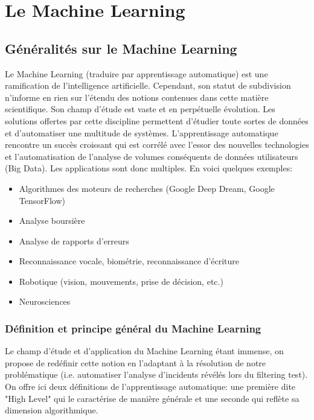 \chapter{ Le  Machine Learning}
\label{Le Machine Learning}
\thispagestyle{fancy}

\section{Généralités sur le Machine Learning}
\label{Le Machine Learning: Généralités sur le Machine Learning}
Le Machine Learning (traduire par apprentissage automatique) est une ramification de l'intelligence artificielle. Cependant, son statut de subdivision n'informe en rien sur l'étendu des notions contenues dans cette matière scientifique. Son champ d'étude est vaste et en perpétuelle évolution. Les solutions offertes par cette discipline permettent d'étudier toute sortes de données et d'automatiser une multitude de systèmes. L'apprentissage automatique rencontre un succès croissant qui est corrélé avec l'essor des nouvelles technologies et l'automatisation de l'analyse de volumes conséquents de données utilisateurs (Big Data). Les applications sont donc multiples. En voici quelques exemples:  

\begin{itemize}
	\item Algorithmes des moteurs de recherches (Google Deep Dream, Google TensorFlow)
	\item Analyse boursière
	\item Analyse de rapports d'erreurs
	\item Reconnaissance vocale, biométrie, reconnaissance d'écriture
	\item Robotique (vision, mouvements, prise de décision, etc.)
	\item Neurosciences 
\end{itemize}

\subsection{Définition et principe général du Machine Learning}
\label{Le Machine Learning: Généralités sur le Machine Learning: Définition et principe général}
Le champ d'étude et d'application du Machine Learning étant immense, on propose de redéfinir cette notion en l'adaptant à la résolution de notre problématique (i.e. automatiser l'analyse d'incidents révélés lors du filtering test).
On offre ici deux définitions de l'apprentissage automatique: une première dite "High Level" qui le caractérise de manière générale et une seconde qui reflète sa dimension algorithmique. 

